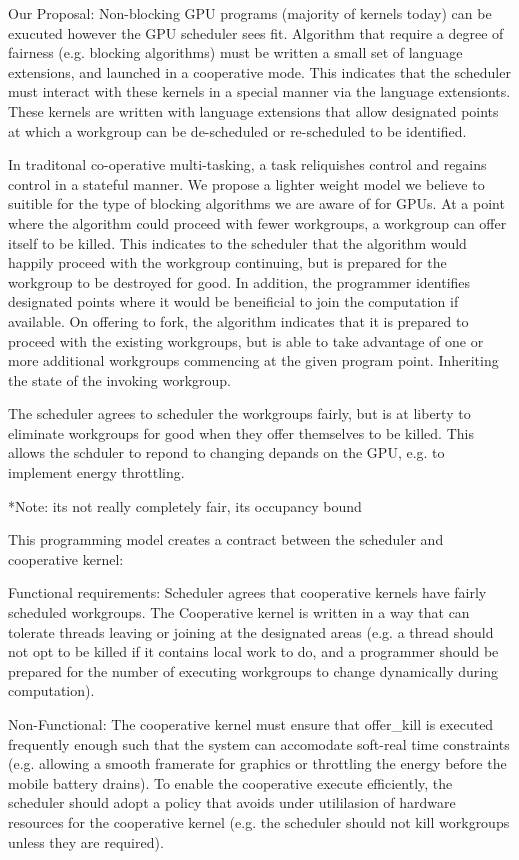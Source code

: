 \documentclass[nocopyrightspace]{sigplanconf-pldi16}
\begin{document}
  Our Proposal: Non-blocking GPU programs (majority of kernels today)
  can be exucuted however the GPU scheduler sees fit. Algorithm that
  require a degree of fairness (e.g. blocking algorithms) must be
  written a small set of language extensions, and launched in a
  cooperative mode. This indicates that the scheduler must interact
  with these kernels in a special manner via the language
  extensionts. These kernels are written with language extensions that
  allow designated points at which a workgroup can be de-scheduled or
  re-scheduled to be identified.

  In traditonal co-operative multi-tasking, a task reliquishes control
  and regains control in a stateful manner. We propose a lighter
  weight model we believe to suitible for the type of blocking
  algorithms we are aware of for GPUs. At a point where the algorithm
  could proceed with fewer workgroups, a workgroup can offer itself
  to be killed. This indicates to the scheduler that the algorithm
  would happily proceed with the workgroup continuing, but is prepared
  for the workgroup to be destroyed for good. In addition, the programmer
  identifies designated points where it would be beneificial to join the
  computation if available. On offering to fork, the algorithm indicates
  that it is prepared to proceed with the existing workgroups, but is able
  to take advantage of one or more additional workgroups commencing at the
  given program point. Inheriting the state of the invoking workgroup.

  The scheduler agrees to scheduler the workgroups fairly, but is at
  liberty to eliminate workgroups for good when they offer themselves
  to be killed. This allows the schduler to repond to changing depands
  on the GPU, e.g. to implement energy throttling.

  *Note: its not really completely fair, its occupancy bound

  This programming model creates a contract between the scheduler
  and cooperative kernel:

  Functional requirements: Scheduler agrees that cooperative kernels
  have fairly scheduled workgroups. The Cooperative kernel is written
  in a way that can tolerate threads leaving or joining at the
  designated areas (e.g. a thread should not opt to be killed if it
  contains local work to do, and a programmer should be prepared for
  the number of executing workgroups to change dynamically during
  computation).

  Non-Functional: The cooperative kernel must ensure that offer\_kill
  is executed frequently enough such that the system can accomodate
  soft-real time constraints (e.g. allowing a smooth framerate for
  graphics or throttling the energy before the mobile battery drains).
  To enable the cooperative execute efficiently, the scheduler should
  adopt a policy that avoids under utililasion of hardware resources
  for the cooperative kernel (e.g. the scheduler should not kill
  workgroups unless they are required).
\end{document}
